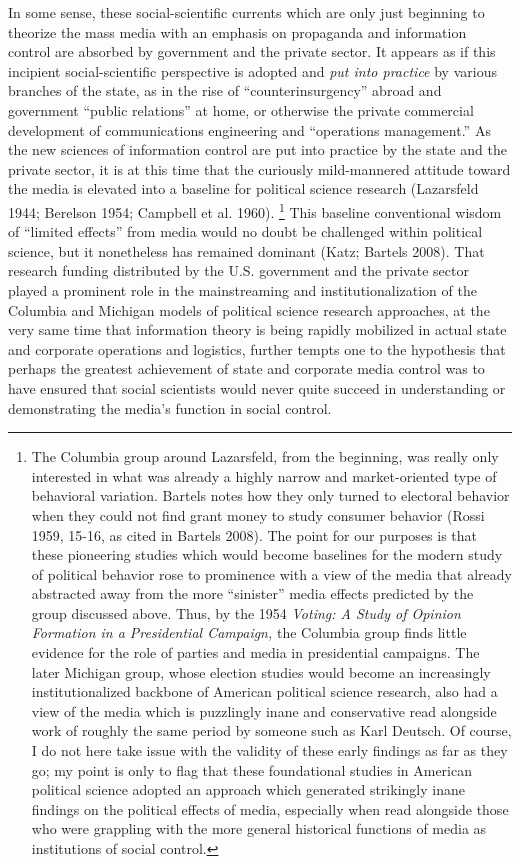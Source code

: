 \documentclass[12pt]{report}
\begin{document}
In some sense, these social-scientific currents which are only just
beginning to theorize the mass media with an emphasis on propaganda
and information control are absorbed by government and the private
sector. It appears as if this incipient social-scientific perspective
is adopted and \emph{put into practice} by various branches of the
state, as in the rise of ``counterinsurgency'' abroad and government
``public relations'' at home, or otherwise the private commercial
development of communications engineering and ``operations management.''
As the new sciences of information control are put into practice by
the state and the private sector, it is at this time that the curiously
mild-mannered attitude toward the media is elevated into a baseline
for political science research (Lazarsfeld 1944; Berelson 1954; Campbell
et al. 1960).%
\footnote{The Columbia group around Lazarsfeld, from the beginning, was really
only interested in what was already a highly narrow and market-oriented
type of behavioral variation. Bartels notes how they only turned to
electoral behavior when they could not find grant money to study consumer
behavior (Rossi 1959, 15-16, as cited in Bartels 2008). The point
for our purposes is that these pioneering studies which would become
baselines for the modern study of political behavior rose to prominence
with a view of the media that already abstracted away from the more
``sinister'' media effects predicted by the group discussed above.
Thus, by the 1954 \emph{Voting: A Study of Opinion Formation in a
Presidential Campaign, }the Columbia group finds little evidence for
the role of parties and media in presidential campaigns. The later
Michigan group, whose election studies would become an increasingly
institutionalized backbone of American political science research,
also had a view of the media which is puzzlingly inane and conservative
read alongside work of roughly the same period by someone such as
Karl Deutsch. Of course, I do not here take issue with the validity
of these early findings as far as they go; my point is only to flag
that these foundational studies in American political science adopted
an approach which generated strikingly inane findings on the political
effects of media, especially when read alongside those who were grappling
with the more general historical functions of media as institutions
of social control.%
} This baseline conventional wisdom of ``limited effects'' from media
would no doubt be challenged within political science, but it nonetheless
has remained dominant (Katz; Bartels 2008). That research funding
distributed by the U.S. government and the private sector played a
prominent role in the mainstreaming and institutionalization of the
Columbia and Michigan models of political science research approaches,
at the very same time that information theory is being rapidly mobilized
in actual state and corporate operations and logistics, further tempts
one to the hypothesis that perhaps the greatest achievement of state
and corporate media control was to have ensured that social scientists
would never quite succeed in understanding or demonstrating the media's
function in social control.
\end{document}
